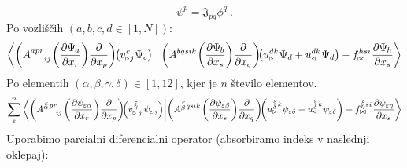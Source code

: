 \begin{equation}
   \psi^p = \mathfrak{J}_{pq} \phi^{q} \ .
   \label{eq:refToEmt}
\end{equation}
Po vozliščih $(a, b, c, d \in [1,N])$:
\begin{equation}
   \braket{
      \qty(A^{a p r}_{\mkern28mu i j} \mkern1mu
      \qty( \pdv{\Psi_{\mkern-1mu a}}{x_r} ) \pdv{}{x_p} ) \mkern-2mu
      \qty(v^{\mkern1mu c}_{\triangleright \mkern1mu j} \mkern1mu \Psi_c ) \mkern5mu  }
   {
      \mkern4mu \qty(A^{b q s i k} \mkern1mu
      \qty( \pdv{\Psi_{\mkern-1mu b}}{x_s} ) \pdv{}{x_q} ) \mkern-4mu
      \qty(u^{d k}_\triangleright \mkern1mu \Psi_d + u^{d k}_\triangleleft \mkern1mu \Psi_d )
      -
      f^{h s i}_{\bowtie} \mkern1mu \pdv{\Psi_{\mkern-1mu h}}{x_s} }
\end{equation}
Po elementih $(\alpha, \beta, \gamma, \delta) \in [1,12]$, kjer je $n$ število elementov.
\begin{equation}
   \sum^n_{\varepsilon}
   \braket{
      \qty(A^{\substack{\mkern2mu \varepsilon \\[-0.65mm] \alpha} \mkern2mu p r}_{\mkern29mu i j} \mkern2mu
      \qty( \pdv{\psi_{ \varepsilon \alpha}}{x_r} ) \frac{\partial}{\partial x_p} ) \mkern-4mu
      \qty(v^{\mkern 2mu \substack{\varepsilon \\[-0.65mm] \gamma \\[-0.2mm]}}_{\triangleright \mkern5mu j} \mkern2mu
         \psi_{\varepsilon \gamma} )}
   {
      \qty(A^{\substack{\mkern2mu \varepsilon \\[-0.05mm] \beta} \mkern2mu q s i k} \mkern2mu
      \qty( \pdv{\psi_{\varepsilon \beta}}{x_s} ) \frac{\partial}{\partial x_q} ) \mkern-4mu
      \qty(u^{\substack{\mkern2mu \varepsilon \\[0.10mm] \delta} \mkern2mu k}_\triangleright
      \psi_{\varepsilon \delta}
      +
      u^{\substack{\mkern2mu \varepsilon \\[0.10mm] \delta} \mkern2mu k}_\triangleleft
      \psi_{\varepsilon \delta} )
      -
      f^{\substack{\mkern2mu \varepsilon \\[-0.59mm] \eta} \mkern1mu s i}_{\bowtie} \mkern1mu
      \pdv{\psi_{\varepsilon \eta}}{x_s}}
\end{equation}
Uporabimo parcialni diferencialni operator (absorbiramo indeks v naslednji oklepaj):
